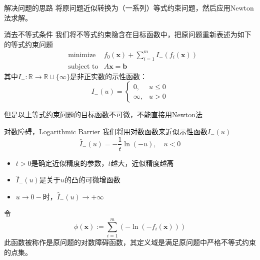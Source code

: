 
\begin{frame}

\begin{block}{解决问题的思路}
将原问题近似转换为（一系列）等式约束问题，然后应用Newton法求解。
\end{block}

\end{frame}


\begin{frame}

\begin{block}{消去不等式条件}
我们将不等式约束隐含在目标函数中，把原问题重新表述为如下的等式约束问题
\begin{eqnarray*}
& \text{minimize} & f_0(\mathbf{x}) + \sum\limits_{i=1}^m I_-(f_i(\mathbf{x})) \\
& \text{subject to} & A\mathbf{x} = \mathbf{b}
\end{eqnarray*}
其中$I_-: \mathbb{R} \to \mathbb{R}\cup\{\infty\}$是非正实数的示性函数：
\[
I_-(u) = \begin{cases}
0, & u \le 0 \\
\infty, & u > 0 
\end{cases}
\]

\vspace{1em}
\pause

但是以上等式约束问题的目标函数不可微，不能直接用Newton法
\end{block}

\end{frame}


\begin{frame}

\begin{block}{对数障碍，Logarithmic Barrier}
我们将用对数函数来近似示性函数$I_-(u)$
$$\widehat{I}_-(u) = -\dfrac{1}{t}\ln(-u), \quad u < 0$$
\vspace{-1em}
\begin{itemize}
\item $t>0$是确定近似精度的参数，$t$越大，近似精度越高
\item $\widehat{I}_-(u)$是关于$u$的凸的可微增函数
\item $u\to 0-$时，$\widehat{I}_-(u)\to +\infty$
\end{itemize}

\vspace{1em}

令
$$\phi(\mathbf{x}) := \sum\limits_{i=1}^m \left( -\ln(-f_i(\mathbf{x})) \right)$$
此函数被称作是原问题的对数障碍函数，其定义域是满足原问题中严格不等式约束的点集。
\end{block}

\end{frame}

